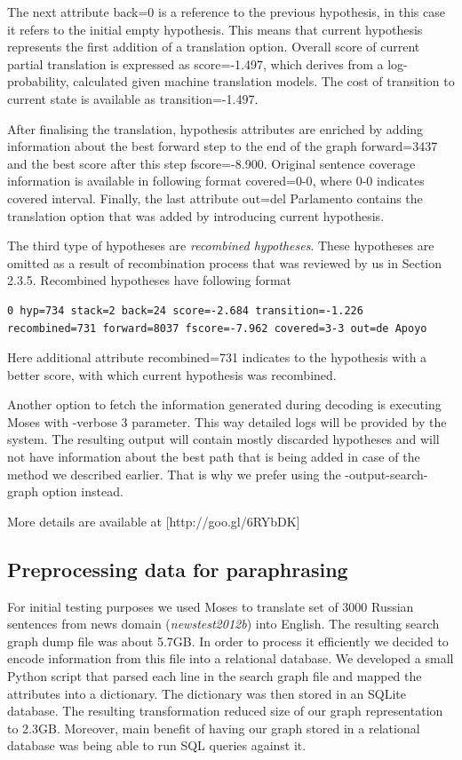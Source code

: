 The next attribute \textsf{back=0} is a reference to the previous hypothesis, in this case it refers to the initial empty hypothesis. This means that current hypothesis represents the first addition of a translation option. Overall score of current partial translation is expressed as \textsf{score=-1.497}, which derives from a log-probability, calculated given machine translation models. The cost of transition to current state is available as \textsf{transition=-1.497}. 

After finalising the translation, hypothesis attributes are enriched by adding information about the best forward step to the end of the graph \textsf{forward=3437} and the best score after this step \textsf{fscore=-8.900}. Original sentence coverage information is available in following format \textsf{covered=0-0}, where \textsf{0-0} indicates covered interval. Finally, the last attribute \textsf{out=del Parlamento} contains the translation option that was added by introducing current hypothesis.

The third type of hypotheses are \textit{recombined hypotheses}. These hypotheses are omitted as a result of recombination process that was reviewed by us in Section 2.3.5. Recombined hypotheses have following format

\begin{verbatim}
0 hyp=734 stack=2 back=24 score=-2.684 transition=-1.226 
recombined=731 forward=8037 fscore=-7.962 covered=3-3 out=de Apoyo
\end{verbatim}

Here additional attribute \textsf{recombined=731} indicates to the hypothesis with a better score, with which current hypothesis was recombined.

Another option to fetch the information generated during decoding is executing Moses with \textsf{-verbose 3} parameter. This way detailed logs will be provided by the system. The resulting output will contain mostly discarded hypotheses and will not have information about the best path that is being added in case of the method we described earlier. That is why we prefer using the \textsf{-output-search-graph} option instead.

More details are available at [http://goo.gl/6RYbDK]

\subsection{Preprocessing data for paraphrasing}

For initial testing purposes we used Moses to translate set of 3000 Russian sentences from news domain (\textit{newstest2012b}) into English. The resulting search graph dump file was about 5.7GB. In order to process it efficiently we decided to encode information from this file into a relational database. We developed a small Python script that parsed each line in the search graph file and mapped the attributes into a dictionary. The dictionary was then stored in an SQLite database. The resulting transformation reduced size of our graph representation to 2.3GB. Moreover, main benefit of having our graph stored in a relational database was being able to run SQL queries against it. 

